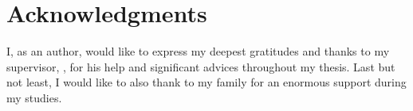 \section*{Acknowledgments}
I, as an author, would like to express my deepest gratitudes and thanks to my supervisor, \Supervisor, for his help and significant advices throughout my thesis. Last but not least, I would like to also thank to my family for an enormous support during my studies.

\vfill